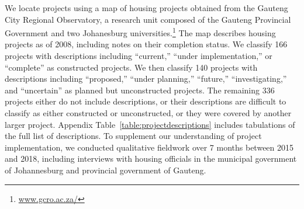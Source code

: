 \documentclass[12pt]{article}
\begin{document}
We locate projects using a map of housing projects obtained from the Gauteng City Regional Observatory, a research unit composed of the Gauteng Provincial Government and two Johanesburg universities.\footnote{\href{url}{www.gcro.ac.za/}}  The map describes housing projects as of 2008, including notes on their completion status.  We classify 166 projects with descriptions including ``current,'' ``under implementation,'' or ``complete'' as constructed projects.  We then classify 140 projects with descriptions including ``proposed,'' ``under planning,'' ``future,'' ``investigating,'' and ``uncertain'' as planned but unconstructed projects.  The remaining 336 projects either do not include descriptions, or their descriptions are difficult to classify as either constructed or unconstructed, or they were covered by another larger project.  Appendix Table~\ref{table:projectdescriptions} includes tabulations of the full list of descriptions.  To supplement our understanding of project implementation, we conducted qualitative fieldwork over 7 months between 2015 and 2018, including interviews with housing officials in the municipal government of Johannesburg and provincial government of Gauteng. 


\end{document}

